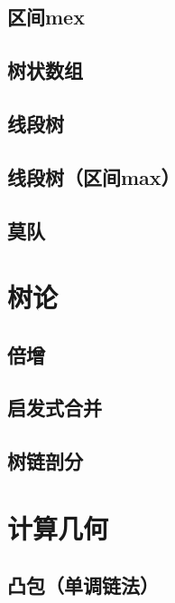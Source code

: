 \documentclass[11pt,a4paper]{ctexart}
\begin{document}
\subsection{区间mex}


\subsection{树状数组}


\subsection{线段树}


\subsection{线段树（区间max）}


\subsection{莫队}


\section{树论}
\subsection{倍增}


\subsection{启发式合并}


\subsection{树链剖分}


\section{计算几何}
\subsection{凸包（单调链法）}

\end{document}
